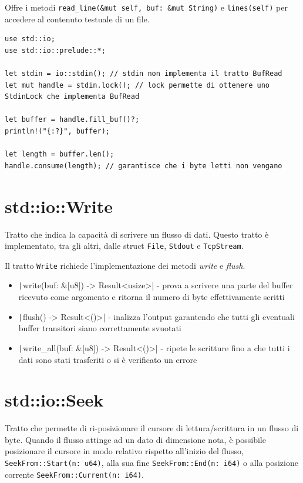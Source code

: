 Offre i metodi \texttt{read\_line(\&mut self, buf: \&mut String)} e \texttt{lines(self)}
per accedere al contenuto testuale di un file.

\begin{verbatim}
use std::io;
use std::io::prelude::*;

let stdin = io::stdin(); // stdin non implementa il tratto BufRead
let mut handle = stdin.lock(); // lock permette di ottenere uno StdinLock che implementa BufRead

let buffer = handle.fill_buf()?;
println!("{:?}", buffer);

let length = buffer.len();
handle.consume(length); // garantisce che i byte letti non vengano
\end{verbatim}


\section{std::io::Write}
Tratto che indica la capacità di scrivere un flusso di dati. Questo tratto è
implementato, tra gli altri, dalle struct \texttt{File}, \texttt{Stdout} e \texttt{TcpStream}.

Il tratto \verb|Write| richiede l'implementazione dei metodi \textit{write} e \textit{flush}.

\begin{itemize}
  \item[] \texttt|write(buf: &[u8]) -> Result<usize>| - prova a
        scrivere una parte del buffer ricevuto come argomento e ritorna il numero di
        byte effettivamente scritti
  \item[] \texttt|flush() -> Result<()>| - inalizza l'output
        garantendo che tutti gli eventuali buffer transitori siano correttamente
        svuotati
  \item [] \texttt|write_all(buf: &[u8]) -> Result<()>| - ripete le
        scritture fino a che tutti i dati sono stati trasferiti o si è verificato un
        errore
\end{itemize}


\section{std::io::Seek}
Tratto che permette di ri-posizionare il cursore di lettura/scrittura in un flusso di byte.
Quando il flusso attinge ad un dato di dimensione nota, è possibile posizionare
il cursore in modo relativo rispetto all'inizio del flusso, \texttt{SeekFrom::Start(n: u64)},
alla sua fine \texttt{SeekFrom::End(n: i64)} o alla posizione corrente \texttt{SeekFrom::Current(n: i64)}.

